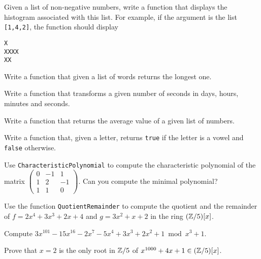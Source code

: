 \begin{prob}\label{prob:histogram}
	Given a list of non-negative numbers, write a function that displays the
	histogram associated with this list. For example, if the argument is the
	list \lstinline{[1,4,2]}, the function should display 
\begin{lstlisting}
X
XXXX
XX
\end{lstlisting}
\end{prob}

\begin{prob}
	Write a function that given a list of words returns the longest one. 
\end{prob}

\begin{prob}
	Write a function that transforms a given number of seconds in days, hours,
	minutes and seconds.
\end{prob}

\begin{prob}
	Write a function that returns the average value of a given list of numbers.
\end{prob}

\begin{prob}
	Write a function that, given a letter, returns \lstinline{true} if the
	letter is a vowel and \lstinline{false} otherwise.
\end{prob}

\begin{prob}
	\label{prob:charmin}
	Use \lstinline{CharacteristicPolynomial} to compute the characteristic
	polynomial of the matrix
	$\begin{pmatrix}
		0 & -1 & 1\\
		1 & 2 & -1\\
		1 & 1 & 0
	\end{pmatrix}$.
	Can you compute the minimal polynomial?
\end{prob}

\begin{prob}
	\label{prob:division}
	Use the function \lstinline{QuotientRemainder} to compute the quotient and
	the remainder of $f=2x^4+3x^3+2x+4$ and $g=3x^2+x+2$ in the ring $(\mathbb{Z}/5)[x]$. 
\end{prob}

\begin{prob}
	\label{prob:mod}
	Compute $3x^{101}-15x^{16}-2x^7-5x^4+3x^3+2x^2+1\bmod x^3+1$. 
\end{prob}

\begin{prob}
	\label{prob:roots}
	Prove that $x=2$ is the only root in $\mathbb{Z}/5$ of $x^{1000}+4x+1\in(\mathbb{Z}/5)[x]$.
\end{prob}

